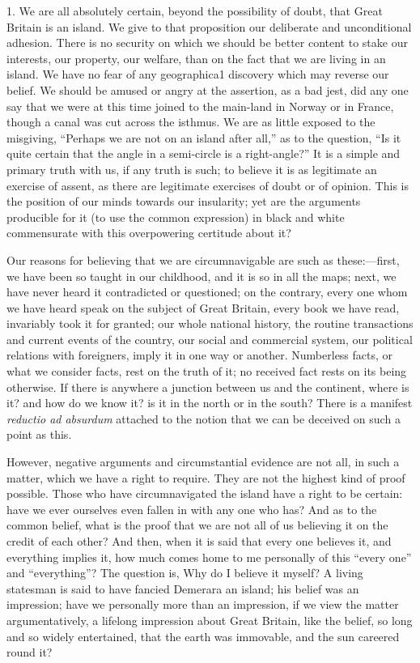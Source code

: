 1. We are all absolutely certain, beyond the possibility of doubt,
that Great Britain is an island. We give to that proposition our
deliberate and unconditional adhesion. There is no security on which
we should be better content to stake our interests, our property, our
welfare, than on the fact that we are living in an island. We have no
fear of any geographica1 discovery which may reverse our belief. We
should be amused or angry at the assertion, as a bad jest, did any one
say that we were at this time joined to the main-land in Norway or in
France, though a canal was cut across the isthmus. We are as little
exposed to the misgiving, ``Perhaps we are not on an island after
all,'' as to the question, ``Is it quite certain that the
angle in a semi-circle is a right-angle?'' It is a simple and
primary truth with us, if any truth is such; to believe it is as
legitimate an exercise of assent, as there are legitimate exercises of
doubt or of opinion. This is the position of our minds towards our
insularity; yet are the arguments producible for it (to use the common
expression) in black and white commensurate with this overpowering
certitude about it?

Our reasons for believing that we are circumnavigable are such as
these:—first, we have been so taught in our childhood, and it is so
in all the maps; next, we have never heard it contradicted or
questioned; on the contrary, every one whom we have heard speak
on the subject of Great Britain, every book we have read, invariably
took it for granted; our whole national history, the routine
transactions and current events of the country, our social and
commercial system, our political relations with foreigners, imply it
in one way or another. Numberless facts, or what we consider facts,
rest on the truth of it; no received fact rests on its being
otherwise. If there is anywhere a junction between us and the
continent, where is it? and how do we know it? is it in the north or
in the south? There is a manifest \emph{reductio ad absurdum} attached
to the notion that we can be deceived on such a point as this.

However, negative arguments and circumstantial evidence are not
all, in such a matter, which we have a right to require. They are not
the highest kind of proof possible. Those who have circumnavigated the
island have a right to be certain: have we ever ourselves even fallen
in with any one who has? And as to the common belief, what is the
proof that we are not all of us believing it on the credit of each
other? And then, when it is said that every one believes it, and
everything implies it, how much comes home to me personally of this
``every one'' and ``everything''? The question is, Why
do I believe it myself? A living statesman is said to have fancied
Demerara an island; his belief was an impression; have we personally
more than an impression, if we view the matter argumentatively, a
lifelong impression about Great Britain, like the belief, so long and
so widely entertained, that the earth was immovable, and the sun
careered round it?

